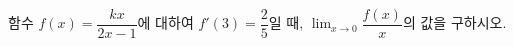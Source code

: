 함수 $f(x)=\dfrac{kx}{2x-1}$에 대하여 $f'(3)=\dfrac{2}{5}$일 때, $\displaystyle\lim_{x\to 0}\dfrac{f(x)}{x}$의 값을 구하시오. 
